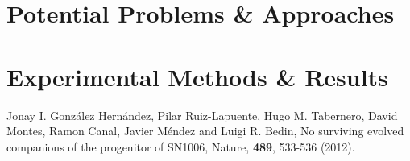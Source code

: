 \documentclass[dvips,12pt]{article}
\begin{document}
\section{Potential Problems \& Approaches}
 
\section{Experimental Methods \& Results}

\begin{thebibliography}{99}

 Jonay I. Gonz\'{a}lez Hern\'{a}ndez, 
Pilar Ruiz-Lapuente,	
Hugo M. Tabernero,	
David Montes,	
Ramon Canal,	
Javier M\'{e}ndez	
and Luigi R. Bedin,
{No surviving evolved companions of the progenitor of SN1006},
Nature, {\bf 489}, 533-536 (2012).

\end{thebibliography}
\end{document}
